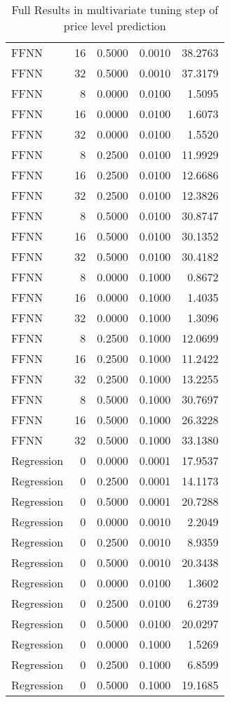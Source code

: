 \begin{table}[h!]
\begin{adjustbox}{max width=\textwidth}
\begin{tabular}{lrrrr}
  FFNN &    16 & 0.5000 & 0.0010 & 38.2763 \\ 
  FFNN &    32 & 0.5000 & 0.0010 & 37.3179 \\ 
  FFNN &     8 & 0.0000 & 0.0100 & 1.5095 \\ 
  FFNN &    16 & 0.0000 & 0.0100 & 1.6073 \\ 
  FFNN &    32 & 0.0000 & 0.0100 & 1.5520 \\ 
  FFNN &     8 & 0.2500 & 0.0100 & 11.9929 \\ 
  FFNN &    16 & 0.2500 & 0.0100 & 12.6686 \\ 
  FFNN &    32 & 0.2500 & 0.0100 & 12.3826 \\ 
  FFNN &     8 & 0.5000 & 0.0100 & 30.8747 \\ 
  FFNN &    16 & 0.5000 & 0.0100 & 30.1352 \\ 
  FFNN &    32 & 0.5000 & 0.0100 & 30.4182 \\ 
  FFNN &     8 & 0.0000 & 0.1000 & 0.8672 \\ 
  FFNN &    16 & 0.0000 & 0.1000 & 1.4035 \\ 
  FFNN &    32 & 0.0000 & 0.1000 & 1.3096 \\ 
  FFNN &     8 & 0.2500 & 0.1000 & 12.0699 \\ 
  FFNN &    16 & 0.2500 & 0.1000 & 11.2422 \\ 
  FFNN &    32 & 0.2500 & 0.1000 & 13.2255 \\ 
  FFNN &     8 & 0.5000 & 0.1000 & 30.7697 \\ 
  FFNN &    16 & 0.5000 & 0.1000 & 26.3228 \\ 
  FFNN &    32 & 0.5000 & 0.1000 & 33.1380 \\ 
  Regression &     0 & 0.0000 & 0.0001 & 17.9537 \\ 
  Regression &     0 & 0.2500 & 0.0001 & 14.1173 \\ 
  Regression &     0 & 0.5000 & 0.0001 & 20.7288 \\ 
  Regression &     0 & 0.0000 & 0.0010 & 2.2049 \\ 
  Regression &     0 & 0.2500 & 0.0010 & 8.9359 \\ 
  Regression &     0 & 0.5000 & 0.0010 & 20.3438 \\ 
  Regression &     0 & 0.0000 & 0.0100 & 1.3602 \\ 
  Regression &     0 & 0.2500 & 0.0100 & 6.2739 \\ 
  Regression &     0 & 0.5000 & 0.0100 & 20.0297 \\ 
  Regression &     0 & 0.0000 & 0.1000 & 1.5269 \\ 
  Regression &     0 & 0.2500 & 0.1000 & 6.8599 \\ 
  Regression &     0 & 0.5000 & 0.1000 & 19.1685 \\ 
   \hline
 \end{tabular}
\end{adjustbox}
\caption{Full Results in multivariate tuning step of price level prediction} 
\label{tab:level.multivar.par.tuning.full}
\end{table}

